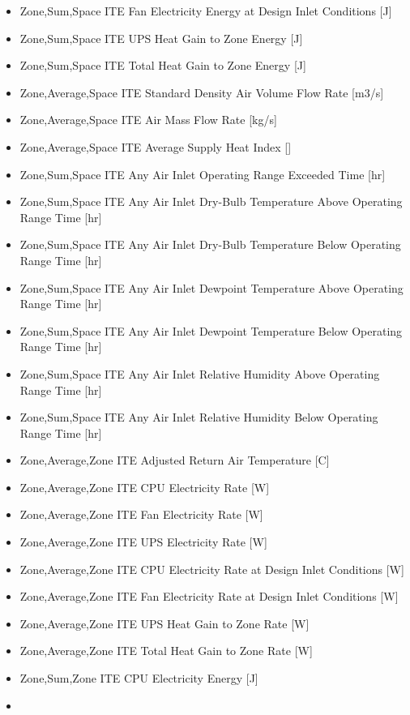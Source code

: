 \begin{itemize}
\item
  Zone,Sum,Space ITE Fan Electricity Energy at Design Inlet Conditions {[}J{]}
\item
  Zone,Sum,Space ITE UPS Heat Gain to Zone Energy {[}J{]}
\item
  Zone,Sum,Space ITE Total Heat Gain to Zone Energy {[}J{]}
\item
  Zone,Average,Space ITE Standard Density Air Volume Flow Rate {[}m3/s{]}
\item
  Zone,Average,Space ITE Air Mass Flow Rate {[}kg/s{]}
\item
  Zone,Average,Space ITE Average Supply Heat Index {[]}
\item
  Zone,Sum,Space ITE Any Air Inlet Operating Range Exceeded Time {[}hr{]}
\item
  Zone,Sum,Space ITE Any Air Inlet Dry-Bulb Temperature Above Operating Range Time {[}hr{]}
\item
  Zone,Sum,Space ITE Any Air Inlet Dry-Bulb Temperature Below Operating Range Time {[}hr{]}
\item
  Zone,Sum,Space ITE Any Air Inlet Dewpoint Temperature Above Operating Range Time {[}hr{]}
\item
  Zone,Sum,Space ITE Any Air Inlet Dewpoint Temperature Below Operating Range Time {[}hr{]}
\item
  Zone,Sum,Space ITE Any Air Inlet Relative Humidity Above Operating Range Time {[}hr{]}
\item
  Zone,Sum,Space ITE Any Air Inlet Relative Humidity Below Operating Range Time {[}hr{]}
\item
  Zone,Average,Zone ITE Adjusted Return Air Temperature {[}C{]}
\item
  Zone,Average,Zone ITE CPU Electricity Rate {[}W{]}
\item
  Zone,Average,Zone ITE Fan Electricity Rate {[}W{]}
\item
  Zone,Average,Zone ITE UPS Electricity Rate {[}W{]}
\item
  Zone,Average,Zone ITE CPU Electricity Rate at Design Inlet Conditions {[}W{]}
\item
  Zone,Average,Zone ITE Fan Electricity Rate at Design Inlet Conditions {[}W{]}
\item
  Zone,Average,Zone ITE UPS Heat Gain to Zone Rate {[}W{]}
\item
  Zone,Average,Zone ITE Total Heat Gain to Zone Rate {[}W{]}
\item
  Zone,Sum,Zone ITE CPU Electricity Energy {[}J{]}
\item

\end{itemize}
